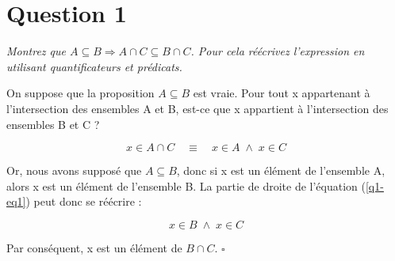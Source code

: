 \section*{Question 1}
\emph{Montrez que \( A \subseteq B \Rightarrow A \cap C \subseteq B \cap C\). Pour cela réécrivez l’expression en utilisant quantificateurs et prédicats.}

\bigskip

On suppose que la proposition \( A \subseteq B \) est vraie. Pour tout x appartenant à l’intersection des ensembles A et B, est-ce que x appartient à l’intersection des ensembles B et C ?

\begin{equation}
	x \in A \cap C \quad \equiv \quad x \in A \; \wedge \; x \in C
	\label{q1-eq1}
\end{equation}

Or, nous avons supposé que \( A \subseteq B \), donc si x est un élément de l’ensemble A, alors x est un élément de l’ensemble B. La partie de droite de l’équation (\ref{q1-eq1}) peut donc se réécrire :

\[x \in B \; \wedge \; x \in C\]

Par conséquent, x est un élément de \( B \cap C \). \quad $\square$